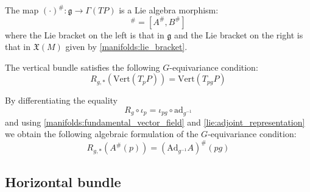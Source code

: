 	\begin{property}
		The map $(\cdot)^\#:\mathfrak{g}\rightarrow\Gamma(TP)$ is a Lie algebra morphism:
		\begin{equation}
			[A, B]^\# = [A^\#, B^\#]
		\end{equation}
		where the Lie bracket on the left is that in $\mathfrak{g}$ and the Lie bracket on the right is that in $\mathfrak{X}(M)$ given by \ref{manifolds:lie_bracket}.
	\end{property}
	
		\begin{property}
		The vertical bundle satisfies the following $G$-equivariance condition:
		\begin{equation}
			R_{g, \ast}(\text{Vert}(T_pP)) = \text{Vert}(T_{pg}P)
		\end{equation}
		
		By differentiating the equality \[R_g\circ\iota_p = \iota_{pg}\circ\text{ad}_{g^{-1}}\] and using \ref{manifolds:fundamental_vector_field} and \ref{lie:adjoint_representation} we obtain the following algebraic formulation of the $G$-equivariance condition:
		\begin{equation}
			R_{g, \ast}\left(A^\#(p)\right) = \left(\text{Ad}_{g^{-1}}A\right)^\#(pg)
		\end{equation}
	\end{property}
	
\subsection{Horizontal bundle}


